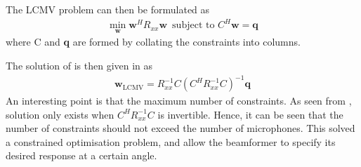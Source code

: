 \documentclass[a4paper,twoside,12pt,hidelinks]{article}
\begin{document}
The LCMV problem can then be formulated as
\begin{align}
\min_\textbf{w} \textbf{w}^HR_{xx}\textbf{w} \, \text{ subject to } C^H\textbf{w}=\textbf{q} \label{eq:LCMV}
\end{align}
where C and \textbf{q} are formed by collating the constraints into columns.

The solution of  is then given in \cite{benesty2008microphone} as 
\begin{align}
\textbf{w}_\text{LCMV}=R_{xx}^{-1}C(C^HR_{xx}^{-1}C)^{-1}\textbf{q} \label{eq:solutionLCMV}
\end{align}
An interesting point is that the maximum number of constraints. As seen from , solution only exists when $C^HR_{xx}^{-1}C$ is invertible. Hence, it can be seen that the number of constraints should not exceed the number of microphones. This solved a constrained optimisation problem, and allow the beamformer to specify its desired response at a certain angle. 
\end{document}
